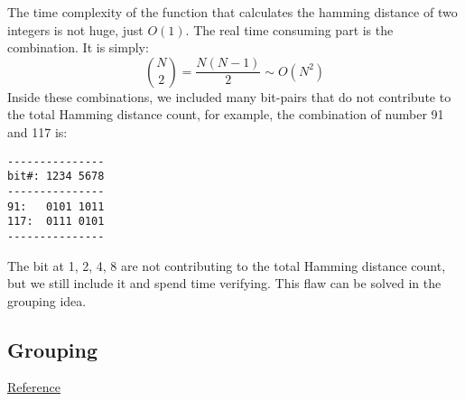 \documentclass[12pt]{book}
\begin{document}
The time complexity of the function that calculates the hamming distance of two integers is not huge, just \(O(1)\). The real time consuming part is the combination. It is simply:
\[
{N \choose 2} = \frac{N(N-1)}{2} \sim O(N^2)
\]
Inside these combinations, we included many bit-pairs that do not contribute to the total Hamming distance count, for example, the combination of number 91 and 117 is:
\begin{verbatim}
---------------
bit#: 1234 5678
---------------
91:   0101 1011
117:  0111 0101
---------------
\end{verbatim}
The bit at 1, 2, 4, 8 are not contributing to the total Hamming distance count, but we still include it and spend time verifying. This flaw can be solved in the grouping idea.

\subsection{Grouping}
\label{sec:org0503607}
\href{https://leetcode.com/problems/total-hamming-distance/discuss/96250/C++-O(n)-runtime-O(1)-space}{Reference}
\end{document}
